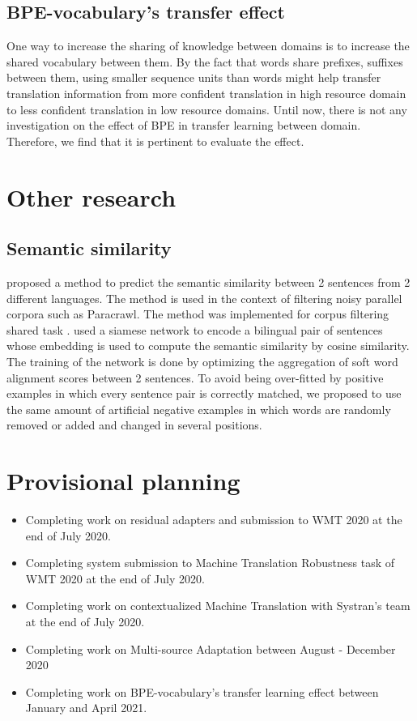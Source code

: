 \documentclass[12pt,a4paper,twoside]{report}
\theoremstyle{definition}
\begin{document}
\subsection*{BPE-vocabulary's transfer effect}
One way to increase the sharing of knowledge between domains is to increase the shared vocabulary between them. By the fact that words share prefixes, suffixes between them, using smaller sequence units than words might help transfer translation information from more confident translation in high resource domain to less confident translation in low resource domains. Until now, there is not any investigation on the effect of BPE in transfer learning between domain. Therefore, we find that it is pertinent to evaluate the effect.

\section*{Other research}
\subsection*{Semantic similarity}
\cite{pham18fixing} proposed a method to predict the semantic similarity between 2 sentences from 2 different languages. The method is used in the context of filtering noisy parallel corpora such as Paracrawl. The method was implemented for corpus filtering shared task  \cite{koehn18findings}. \cite{pham18fixing} used a siamese network to encode a bilingual pair of sentences whose embedding is used to compute the semantic similarity by cosine similarity. The training of the network is done by optimizing the aggregation of soft word alignment scores between 2 sentences. To avoid being over-fitted by positive examples in which every sentence pair is correctly matched, we proposed to use the same amount of artificial negative examples in which words are randomly removed or added and changed in several positions.
\section*{Provisional planning}
\begin{itemize}
	\item Completing work on residual adapters and submission to WMT 2020 at the end of July 2020.
	\item Completing system submission to Machine Translation Robustness task of WMT 2020 at the end of July 2020.
	\item Completing work on contextualized Machine Translation with Systran's team at the end of July 2020.
	\item Completing work on Multi-source Adaptation between August - December 2020
	\item Completing work on BPE-vocabulary's transfer learning effect between January and April 2021.
\end{itemize}


\end{document}
